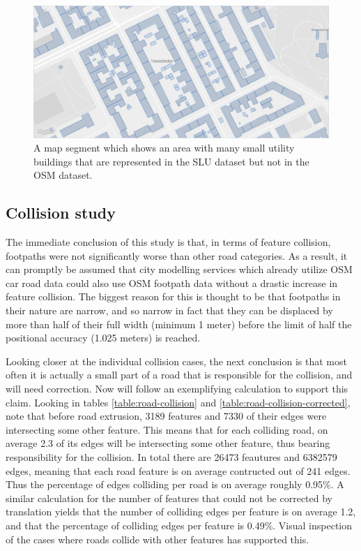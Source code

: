 \documentclass{kththesis}
\begin{document}
\begin{figure}[H]
    \centering
    \includegraphics[width=\textwidth,height=0.5\textheight,keepaspectratio]{img_map_utility_buildings}
    \caption{A map segment which shows an area with many small utility buildings that are represented in the SLU dataset but not in the OSM dataset.}
    \label{fig:osm-slu-map-utility-buildings}
\end{figure}


\subsection{Collision study}

The immediate conclusion of this study is that, in terms of feature collision, footpaths were not significantly worse than other road categories.
As a result, it can promptly be assumed that city modelling services which already utilize OSM car road data could also use OSM footpath data without a drastic increase in feature collision.
The biggest reason for this is thought to be that footpaths in their nature are narrow, and so narrow in fact that they can be displaced by more than half of their full width (minimum 1 meter) before the limit of half the positional accuracy (1.025 meters) is reached.

Looking closer at the individual collision cases, the next conclusion is that most often it is actually a small part of a road that is responsible for the collision, and will need correction.
Now will follow an exemplifying calculation to support this claim.
Looking in tables \ref{table:road-collision} and \ref{table:road-collision-corrected}, note that before road extrusion, 3189 features and 7330 of their edges were intersecting some other feature.
This means that for each colliding road, on average 2.3 of its edges will be intersecting some other feature, thus bearing responsibility for the collision.
In total there are 26473 feautures and 6382579 edges, meaning that each road feature is on average contructed out of 241 edges.
Thus the percentage of edges colliding per road is on average roughly 0.95\%.
A similar calculation for the number of features that could not be corrected by translation yields that the number of colliding edges per feature is on average 1.2, and that the percentage of colliding edges per feature is 0.49\%.
Visual inspection of the cases where roads collide with other features has supported this.
\end{document}
